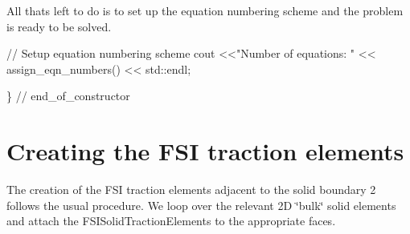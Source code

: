 All that\textquotesingle{}s left to do is to set up the equation numbering scheme and the problem is ready to be solved.


\begin{DoxyCodeInclude}

 \textcolor{comment}{// Setup equation numbering scheme}
 cout <<\textcolor{stringliteral}{"Number of equations: "} << assign\_eqn\_numbers() << std::endl; 

\} \textcolor{comment}{// end\_of\_constructor}

\end{DoxyCodeInclude}




 

\hypertarget{index_fsi_traction}{}\section{Creating the F\+S\+I traction elements}\label{index_fsi_traction}
The creation of the F\+SI traction elements adjacent to the solid boundary 2 follows the usual procedure. We loop over the relevant 2D \char`\"{}bulk\char`\"{} solid elements and attach the {\ttfamily F\+S\+I\+Solid\+Traction\+Elements} to the appropriate faces.


